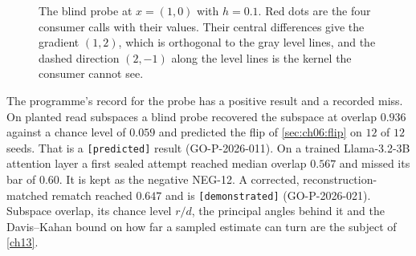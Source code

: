 \begin{figure}[tbp]\centering
{}
\caption{The blind probe at $x=(1,0)$ with $h=0.1$. Red dots are the four consumer calls with their values. Their central differences give the gradient $(1,2)$, which is orthogonal to the gray level lines, and the dashed direction $(2,-1)$ along the level lines is the kernel the consumer cannot see.}
\label{fig:ch06:probe}
\end{figure}

The programme's record for the probe has a positive result and a recorded miss. On planted read subspaces a blind probe recovered the subspace at overlap $0.936$ against a chance level of $0.059$ and predicted the flip of \cref{sec:ch06:flip} on $12$ of $12$ seeds. That is a \texttt{[predicted]} result (GO-P-2026-011). On a trained Llama-3.2-3B attention layer a first sealed attempt reached median overlap $0.567$ and missed its bar of $0.60$. It is kept as the negative NEG-12. A corrected, reconstruction-matched rematch reached $0.647$ and is \texttt{[demonstrated]} (GO-P-2026-021). Subspace overlap, its chance level $r/d$, the principal angles behind it and the Davis--Kahan bound on how far a sampled estimate can turn are the subject of \cref{ch13}.



